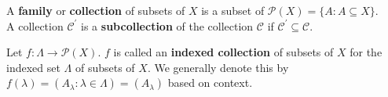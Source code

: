 \begin{definition}[Collections]
	A \textbf{family} or \textbf{collection} of subsets of $X$ is a subset of $\mathscr{P}\left( X \right) = \{A : A\subseteq X\} $.\\
	A collection $\mathscr{C}^{\prime}$ is a \textbf{subcollection} of the collection $\mathscr{C}$ if $\mathscr{C}^{\prime} \subseteq \mathscr{C}$.
\end{definition}
\begin{definition}
	Let $f:\Lambda \to \mathscr{P}\left( X \right)$. $f$ is called an \textbf{indexed collection} of subsets of $X$ for the indexed set $\Lambda$ of subsets of $X$. We generally denote this by $ f\left( \lambda \right) = \left(A_{\lambda} : \lambda \in \Lambda\right) = \left( A_{\lambda}\right) $ based on context.
\end{definition}

